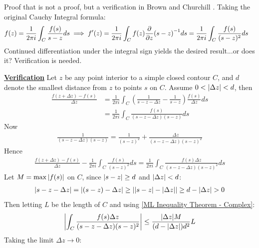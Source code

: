 \documentclass[12pt, english]{book}
\makeatletter
\renewenvironment{proof}[1][\proofname]{\par
	\pushQED{\qed}%
	\normalfont \topsep6\p@\@plus6\p@\relax
	\list{}{%
		\settowidth{\leftmargin}{\itshape\proofname:\hskip\labelsep}%
		\setlength{\labelwidth}{0pt}%
		\setlength{\itemindent}{-\leftmargin}%
		}%
	\item[\hskip\labelsep\itshape#1\@addpunct{:}]\ignorespaces
	}{\popQED\endlist\@endpefalse}
\makeatother
\begin{document}
	\begin{proof}
		Proof that is not a proof, but a verification in Brown and Churchill \cite{Brown.J;Churchill.R-Complex-Variables-2014}. \newline
		Taking the original Cauchy Integral formula:
		\begin{align*}
			f(z) = \frac{1}{2\pi i} \int_{C} \frac{f(s)}{s-z} ds
			&\implies f'(z) = \frac{1}{2\pi i} \int_{C} f(z) \pdv{z}(s-z)^{-1} ds = \frac{1}{2\pi i} \int_{C} \frac{f(s)}{(s-z)^2} ds
		\end{align*}
		Continued differentiation under the integral sign yields the desired result...or does it? Verification is needed. 
		
		\underline{\textbf{Verification}} \newline
		Let \(z\) be any point interior to a simple closed contour \(C\), and \(d\) denote the smallest distance from \(z\) to points \(s\) on \(C\). Assume \(0 < \abs{\Delta z} < d\), then 
		\begin{align*}
			\frac{f(z + \Delta z) - f(s)}{\Delta z} 
			&= \frac{1}{2 \pi i} \int_{C} \left(\frac{1}{s - z - \Delta z} - \frac{1}{s - z}\right) \frac{f(s)}{\Delta z} ds \\
			&= \frac{1}{2\pi i} \int_{C} \frac{f(s)}{(s - z - \Delta z)(s-z)} ds
		\end{align*}
		Now
		\begin{align*}
			\frac{1}{(s-z-\Delta z)(s-z)} = \frac{1}{(s-z)^2} + \frac{\Delta z}{(s-z-\Delta z)(s-z)^2}
		\end{align*}
		Hence
		\begin{align*}
			\frac{f(z + \Delta z) - f(s)}{\Delta z} - \frac{1}{2\pi i} \int_{C} \frac{f(s)}{(s-z)^2} ds = \frac{1}{2\pi i} \int_{C} \frac{f(s)\Delta z}{(s-z-\Delta z)(s-z)^2} ds
		\end{align*}
		Let \(M = \max{\abs{f(s)}}\) on \(C\), since \(\abs{s-z} \geq d\) and \(\abs{\Delta z}<d\):
		\begin{align*}
			\abs{s-z-\Delta z} = \abs{(s-z) - \Delta z} \geq \abs{\abs{s-z} - \abs{\Delta z}} \geq d - \abs{\Delta z} > 0
		\end{align*}
		Then letting \(L\) be the length of \(C\) and using \cref{ML Inequality Theorem - Complex}:
		\begin{align*}
			\abs{\int_{C} \frac{f(s) \Delta z}{(s-z-\Delta z)(s-z)^2}} 
			\leq \frac{\abs{\Delta z} M}{(d - \abs{\Delta z}) d^2} L
		\end{align*}
		Taking the limit \(\Delta z \rightarrow 0\):
		\begin{align*}

\end{align*}
\end{proof}
\end{document}

